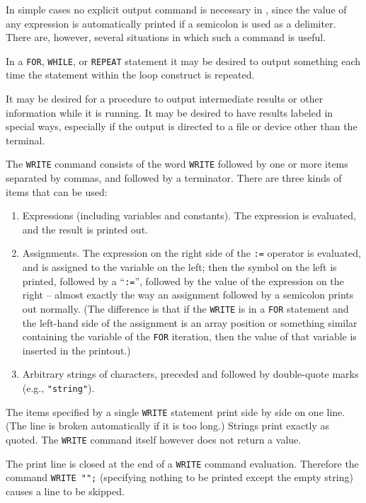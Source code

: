 In simple cases no explicit output command is necessary in
{\REDUCE}, since the value of any expression is automatically printed if a
semicolon is used as a delimiter.  There are, however, several situations
in which such a command is useful.

In a \texttt{FOR}, \texttt{WHILE}, or \texttt{REPEAT} statement it may be desired
to output something each time the statement within the loop construct is
repeated.

It may be desired for a procedure to output intermediate results or other
information while it is running. It may be desired to have results labeled
in special ways, especially if the output is directed to a file or device
other than the terminal.

The \texttt{WRITE} command consists of the word \texttt{WRITE} followed by one
or more items separated by commas, and followed by a terminator.  There
are three kinds of items that can be used:
\begin{enumerate}
\item Expressions (including variables and constants).  The expression is
evaluated, and the result is printed out.

\item Assignments.  The expression on the right side of the \texttt{:=}
operator is evaluated, and is assigned to the variable on the left; then
the symbol on the left is printed, followed by a ``\texttt{:=}'', followed by
the value of the expression on the right -- almost exactly the way an
assignment followed by a semicolon prints out normally. (The difference is
that if the \texttt{WRITE} is in a \texttt{FOR} statement and the left-hand side
of the assignment is an array position or something similar containing the
variable of the \texttt{FOR} iteration, then the value of that variable is
inserted in the printout.)

\item Arbitrary strings of characters, preceded and followed by double-quote
marks (e.g., \texttt{"string"}).
\end{enumerate}
The items specified by a single \texttt{WRITE} statement print side by side
on one line. (The line is broken automatically if it is too long.) Strings
print exactly as quoted.  The \texttt{WRITE} command itself however does not
return a value.

The print line is closed at the end of a \texttt{WRITE} command evaluation.
Therefore the command \texttt{WRITE "";} (specifying nothing to be printed
except the empty string) causes a line to be skipped.

